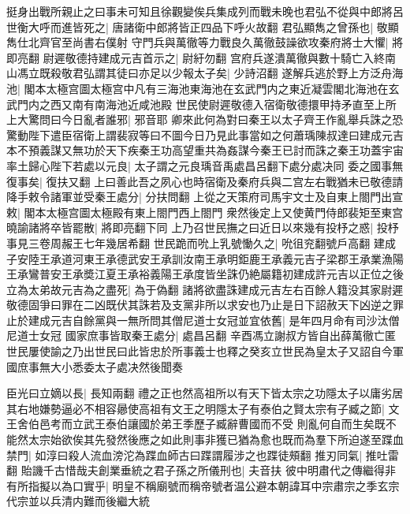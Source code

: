 挺身出戰所親止之曰事未可知且徐觀變俟兵集成列而戰未晚也君弘不從與中郎將呂世衡大呼而進皆死之|{
	唐諸衛中郎將皆正四品下呼火故翻}
君弘顯雋之曾孫也|{
	敬顯雋仕北齊官至尚書右僕射}
守門兵與萬徹等力戰良久萬徹鼓譟欲攻秦府將士大懼|{
	將即亮翻}
尉遲敬德持建成元吉首示之|{
	尉紆勿翻}
宫府兵遂潰萬徹與數十騎亡入終南山馮立既殺敬君弘謂其徒曰亦足以少報太子矣|{
	少詩沼翻}
遂解兵逃於野上方泛舟海池|{
	閣本太極宫圖太極宫中凡有三海池東海池在玄武門内之東近凝雲閣北海池在玄武門内之西又南有南海池近咸池殿}
世民使尉遲敬德入宿衛敬德擐甲持矛直至上所上大驚問曰今日亂者誰邪|{
	邪音耶}
卿來此何為對曰秦王以太子齊王作亂舉兵誅之恐驚動陛下遣臣宿衛上謂裴寂等曰不圖今日乃見此事當如之何蕭瑀陳叔達曰建成元吉本不預義謀又無功於天下疾秦王功高望重共為姦謀今秦王已討而誅之秦王功蓋宇宙率土歸心陛下若處以元良|{
	太子謂之元良瑀音禹處昌呂翻下處分處决同}
委之國事無復事矣|{
	復扶又翻}
上曰善此吾之夙心也時宿衛及秦府兵與二宫左右戰猶未已敬德請降手敕令諸軍並受秦王處分|{
	分扶問翻}
上從之天策府司馬宇文士及自東上閤門出宣敕|{
	閣本太極宫圖太極殿有東上閤門西上閤門}
衆然後定上又使黄門侍郎裴矩至東宫曉諭諸將卒皆罷散|{
	將即亮翻下同}
上乃召世民撫之曰近日以來幾有投杼之惑|{
	投杼事見三卷周赧王七年幾居希翻}
世民跪而吮上乳號慟久之|{
	吮徂兖翻號戶高翻}
建成子安陸王承道河東王承德武安王承訓汝南王承明鉅鹿王承義元吉子梁郡王承業漁陽王承鸞普安王承奬江夏王承裕義陽王承度皆坐誅仍絶屬籍初建成許元吉以正位之後立為太弟故元吉為之盡死|{
	為于偽翻}
諸將欲盡誅建成元吉左右百餘人籍没其家尉遲敬德固爭曰罪在二凶既伏其誅若及支黨非所以求安也乃止是日下詔赦天下凶逆之罪止於建成元吉自餘黨與一無所問其僧尼道士女冠並宜依舊|{
	是年四月命有司沙汰僧尼道士女冠}
國家庶事皆取秦王處分|{
	處昌呂翻}
辛酉馮立謝叔方皆自出薛萬徹亡匿世民屢使諭之乃出世民曰此皆忠於所事義士也釋之癸亥立世民為皇太子又詔自今軍國庶事無大小悉委太子處决然後聞奏

臣光曰立嫡以長|{
	長知兩翻}
禮之正也然高祖所以有天下皆太宗之功隱太子以庸劣居其右地嫌勢逼必不相容曏使高祖有文王之明隱太子有泰伯之賢太宗有子臧之節|{
	文王舍伯邑考而立武王泰伯讓國於弟王季歷子臧辭曹國而不受}
則亂何自而生矣既不能然太宗始欲俟其先發然後應之如此則事非獲已猶為愈也既而為羣下所迫遂至蹀血禁門|{
	如淳曰殺人流血滂沱為蹀血師古曰蹀謂履涉之也蹀徒頰翻}
推刃同氣|{
	推吐雷翻}
貽譏千古惜哉夫創業垂統之君子孫之所儀刑也|{
	夫音扶}
彼中明肅代之傳繼得非有所指擬以為口實乎|{
	明皇不稱廟號而稱帝號者温公避本朝諱耳中宗肅宗之季玄宗代宗並以兵清内難而後繼大統}


